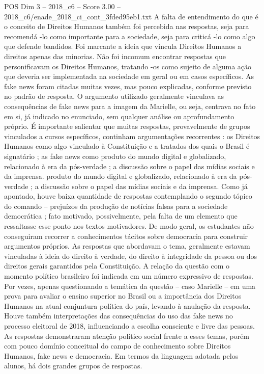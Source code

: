 \begin{textsample}{POS Dim 3 – 2018\_c6 – Score 3.00 – 2018\_c6/enade\_2018\_ci\_cont\_3fded95eb1.txt}
A falta de entendimento do que é o conceito de Direitos Humanos também foi percebida nas respostas, seja para recomendá -lo como importante para a sociedade, seja para criticá -lo como algo que defende bandidos.
Foi marcante a ideia que vincula Direitos Humanos a direitos apenas das minorias.
Não foi incomum encontrar respostas que personificavam os Direitos Humanos, tratando -os como sujeito de alguma ação que deveria ser implementada na sociedade em geral ou em casos específicos.
As fake news foram citadas muitas vezes, mas pouco explicadas, conforme previsto no padrão de resposta.
O argumento utilizado geralmente vinculava as consequências de fake news para a imagem da Marielle, ou seja, centrava no fato em si, já indicado no enunciado, sem qualquer análise ou aprofundamento próprio.
É importante salientar que muitas respostas, provavelmente de grupos vinculados a cursos específicos, continham argumentações recorrentes : os Direitos Humanos como algo vinculado à Constituição e a tratados dos quais o Brasil é signatário ; as fake news como produto do mundo digital e globalizado, relacionado à era da pós-verdade ; a discussão sobre o papel das mídias sociais e da imprensa. produto do mundo digital e globalizado, relacionado à era da pós-verdade ; a discussão sobre o papel das mídias sociais e da imprensa.
Como já apontado, houve baixa quantidade de respostas contemplando o segundo tópico do comando – prejuízos da produção de notícias falsas para a sociedade democrática ; fato motivado, possivelmente, pela falta de um elemento que ressaltasse esse ponto nos textos motivadores.
De modo geral, os estudantes não conseguiram recorrer a conhecimentos tácitos sobre democracia para construir argumentos próprios.
As respostas que abordavam o tema, geralmente estavam vinculadas à ideia do direito à verdade, do direito à integridade da pessoa ou dos direitos gerais garantidos pela Constituição.
A relação da questão com o momento político brasileiro foi indicada em um número expressivo de respostas.
Por vezes, apenas questionando a temática da questão – caso Marielle – em uma prova para avaliar o ensino superior no Brasil ou a importância dos Direitos Humanos na atual conjuntura política do país, levando à anulação da resposta.
Houve também interpretações das consequências do uso das fake news no processo eleitoral de 2018, influenciando a escolha consciente e livre das pessoas.
As respostas demonstraram atenção político social frente a esses temas, porém com pouco domínio conceitual do campo de conhecimento sobre Direitos Humanos, fake news e democracia.
Em termos da linguagem adotada pelos alunos, há dois grandes grupos de respostas.

\end{textsample}
